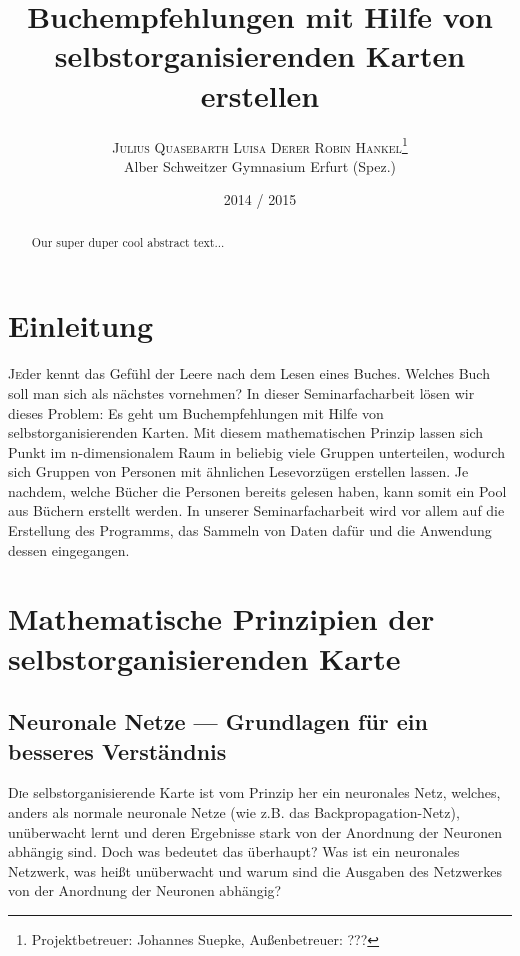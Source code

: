 \documentclass[twoside,a4paper,draft]{article}
\title{\vspace{-15mm}\fontsize{24pt}{10pt}\selectfont\bfseries{}Buchempfehlungen mit Hilfe von selbstorganisierenden Karten erstellen}
\author{\large\textsc{Julius Quasebarth \quad Luisa Derer \quad Robin Hankel}\thanks{Projektbetreuer: Johannes Suepke, Außenbetreuer: ???}\\[2mm]\normalsize Alber Schweitzer Gymnasium Erfurt (Spez.)\\\vspace{-5mm}}
\date{2014 / 2015}
\newcommand{\commonlettrine}[1]{\lettrine[nindent=0em,lines=2]{#1}}
\begin{document}
\maketitle

\thispagestyle{fancy}


\begin{otherlanguage}{english}
\begin{abstract}
\noindent
Our super duper cool abstract text...
\end{abstract}
\end{otherlanguage}

\tableofcontents

\section{Einleitung}

\commonlettrine{J}eder kennt das Gefühl der Leere nach dem Lesen eines Buches. Welches Buch soll man sich als nächstes vornehmen? In dieser Seminarfacharbeit lösen wir dieses Problem: Es geht um Buchempfehlungen mit Hilfe von selbstorganisierenden Karten. Mit diesem mathematischen Prinzip lassen sich Punkt im n-dimensionalem Raum in beliebig viele Gruppen unterteilen, wodurch sich Gruppen von Personen mit ähnlichen Lesevorzügen erstellen lassen. Je nachdem, welche Bücher die Personen bereits gelesen haben, kann somit ein \glqq{}Pool\grqq{} aus Büchern erstellt werden. In unserer Seminarfacharbeit wird vor allem auf die Erstellung des Programms, das Sammeln von Daten dafür und die Anwendung dessen eingegangen.

\section{Mathematische Prinzipien der selbstorganisierenden Karte}
\subsection{Neuronale Netze --- Grundlagen für ein besseres Verständnis}

\commonlettrine{D}ie selbstorganisierende Karte ist vom Prinzip her ein neuronales Netz, welches, anders als \glqq{}normale\grqq{} neuronale Netze (wie z.B. das Backpropagation-Netz), unüberwacht lernt und deren Ergebnisse stark von der Anordnung der Neuronen abhängig sind. Doch was bedeutet das überhaupt? Was ist ein neuronales Netzwerk, was heißt \glqq{}unüberwacht\grqq{} und warum sind die Ausgaben des Netzwerkes von der Anordnung der Neuronen abhängig?
\end{document}
